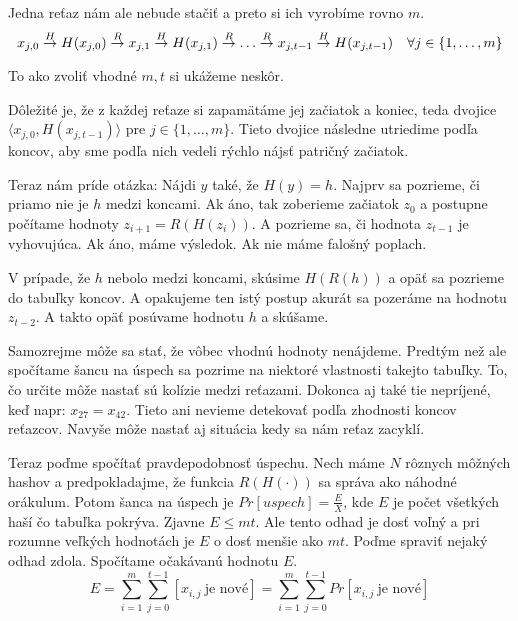 \noindent
Jedna reťaz nám ale nebude stačiť a preto si ich vyrobíme rovno $m$.
\begin{equation*}
    x_{j,0} \toa{H} H(x_{j,0}) \toa{R}
    x_{j,1} \toa{H} H(x_{j,1}) \toa{R} \dots \toa{R}
    x_{j,t-1} \toa{H} H(x_{j,t-1})
    \quad \forall j \in \{1,\dots,m\}
\end{equation*}

To ako zvoliť vhodné $m, t$ si ukážeme neskôr.

Dôležité je, že z každej reťaze si zapamätáme jej začiatok a koniec,
teda dvojice
$\langle x_{j,0}, H(x_{j,t-1})\rangle$ pre $j \in \{1,\dots,m\}$.
Tieto dvojice následne utriedime podľa koncov,
aby sme podľa nich vedeli rýchlo nájsť patričný začiatok.

\medskip
Teraz nám príde otázka: \clqq Nájdi $y$ také, že $H(y)=h$.\crqq
Najprv sa pozrieme, či priamo nie je $h$ medzi koncami.
Ak áno, tak zoberieme začiatok $z_0$ a postupne počítame hodnoty
$z_{i+1} = R(H(z_i))$.
A pozrieme sa, či hodnota $z_{t-1}$ je vyhovujúca.
Ak áno, máme výsledok. Ak nie máme falošný poplach.

V prípade, že $h$ nebolo medzi koncami, skúsime $H(R(h))$
a opäť sa pozrieme do tabuľky koncov.
A opakujeme ten istý postup akurát sa pozeráme na hodnotu $z_{t-2}$.
A takto opäť posúvame hodnotu $h$ a skúšame.

Samozrejme môže sa stať, že vôbec vhodnú hodnoty nenájdeme.
Predtým než ale spočítame šancu na úspech sa pozrime
na niektoré vlastnosti takejto tabuľky.
To, čo určite môže nastať sú kolízie medzi reťazami.
Dokonca aj také tie nepríjené, keď napr: $x_{27} = x_{42}$.
Tieto ani nevieme detekovať podľa zhodnosti koncov reťazcov.
Navyše môže nastať aj situácia kedy sa nám reťaz zacyklí. 

Teraz poďme spočítať pravdepodobnosť úspechu.
Nech máme $N$ rôznych môžných hashov a predpokladajme, že
funkcia $R(H(\cdot))$ sa správa ako náhodné orákulum.
Potom šanca na úspech je $Pr[uspech] = \frac{E}{X}$,
kde $E$ je počet všetkých haší čo tabuľka pokrýva.
Zjavne $E \leq mt$.
Ale tento odhad je dosť voľný a pri rozumne veľkých hodnotách je $E$ 
o dosť menšie ako $mt$. 
Poďme spraviť nejaký odhad zdola.
Spočítame očakávanú hodnotu $E$.
\begin{equation*}
    E = \sum_{i=1}^m \sum_{j=0}^{t-1} [x_{i,j} ~\text{je nové}] = 
        \sum_{i=1}^m \sum_{j=0}^{t-1} Pr[x_{i,j} ~\text{je nové}] 
\end{equation*}

